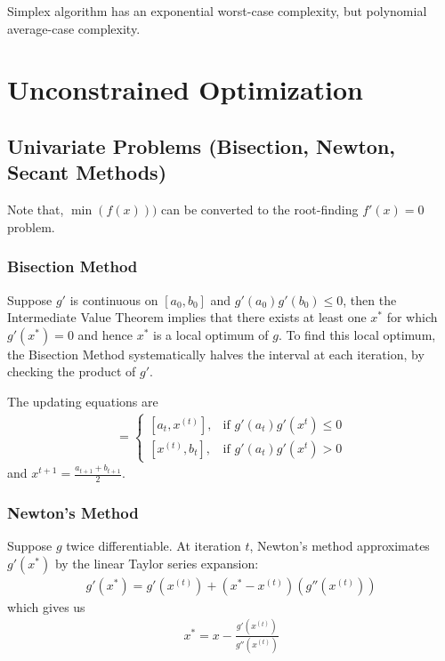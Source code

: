 



Simplex algorithm has an exponential worst-case complexity, but polynomial average-case complexity.

\chapter{Unconstrained Optimization}
\section{Univariate Problems (Bisection, Newton, Secant Methods)}
Note that, $\min(f(x)))$ can be converted to the root-finding $f'(x) = 0$ problem.

\subsection{Bisection Method}
Suppose $g'$ is continuous on $[a_0,b_0]$ and $g'(a_0)g'(b_0) \le 0$, then the Intermediate Value Theorem implies that there exists at least one $x^*$ for which $g'(x^*) = 0$ and hence $x^*$ is a local optimum of $g$. To find this local optimum, the Bisection Method systematically halves the interval at each iteration, by checking the product of $g'$.

The updating equations are
\begin{align}
[a_{t+1},b_{t+1}] =
	\begin{cases}
		[a_t,x^{(t)}], & \mbox{if } g'(a_t)g'(x^{t}) \le 0 \\
		[x^{(t)},b_t], & \mbox{if } g'(a_t)g'(x^{t}) > 0
	\end{cases}
\end{align}
and $x^{t+1} = \frac{a_{t+1}+b_{t+1}}{2}$.

\subsection{Newton's Method}
Suppose $g$ twice differentiable. At iteration $t$, Newton's method approximates $g'(x^*)$ by the linear Taylor series expansion:
\begin{align}
	g'(x^*) = g'(x^{(t)}) + (x^*-x^{(t)})(g''(x^{(t)}))
\end{align}
which gives us
\begin{align}
	x^* = x - \frac{g'(x^{(t)})}{g''(x^{(t)})}
\end{align}

